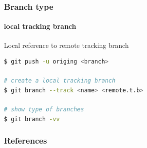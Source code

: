 \documentclass{beamer}
\begin{document}
	\begin{frame}[fragile]
		\frametitle{Branch type}
		\framesubtitle{local tracking branch}
		Local reference to remote tracking branch

\begin{lstlisting}[language=bash]
$ git push -u origing <branch>

# create a local tracking branch
$ git branch --track <name> <remote.t.b>

# show type of branches
$ git branch -vv
\end{lstlisting}	
		
	\end{frame}
	
	\begin{frame}[allowframebreaks]
        \frametitle{References}
        
        
	\end{frame}
\end{document}
